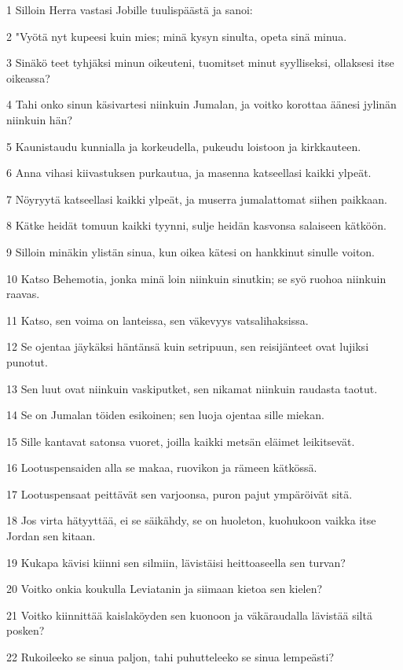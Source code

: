 \par 1 Silloin Herra vastasi Jobille tuulispäästä ja sanoi:
\par 2 "Vyötä nyt kupeesi kuin mies; minä kysyn sinulta, opeta sinä minua.
\par 3 Sinäkö teet tyhjäksi minun oikeuteni, tuomitset minut syylliseksi, ollaksesi itse oikeassa?
\par 4 Tahi onko sinun käsivartesi niinkuin Jumalan, ja voitko korottaa äänesi jylinän niinkuin hän?
\par 5 Kaunistaudu kunnialla ja korkeudella, pukeudu loistoon ja kirkkauteen.
\par 6 Anna vihasi kiivastuksen purkautua, ja masenna katseellasi kaikki ylpeät.
\par 7 Nöyryytä katseellasi kaikki ylpeät, ja muserra jumalattomat siihen paikkaan.
\par 8 Kätke heidät tomuun kaikki tyynni, sulje heidän kasvonsa salaiseen kätköön.
\par 9 Silloin minäkin ylistän sinua, kun oikea kätesi on hankkinut sinulle voiton.
\par 10 Katso Behemotia, jonka minä loin niinkuin sinutkin; se syö ruohoa niinkuin raavas.
\par 11 Katso, sen voima on lanteissa, sen väkevyys vatsalihaksissa.
\par 12 Se ojentaa jäykäksi häntänsä kuin setripuun, sen reisijänteet ovat lujiksi punotut.
\par 13 Sen luut ovat niinkuin vaskiputket, sen nikamat niinkuin raudasta taotut.
\par 14 Se on Jumalan töiden esikoinen; sen luoja ojentaa sille miekan.
\par 15 Sille kantavat satonsa vuoret, joilla kaikki metsän eläimet leikitsevät.
\par 16 Lootuspensaiden alla se makaa, ruovikon ja rämeen kätkössä.
\par 17 Lootuspensaat peittävät sen varjoonsa, puron pajut ympäröivät sitä.
\par 18 Jos virta hätyyttää, ei se säikähdy, se on huoleton, kuohukoon vaikka itse Jordan sen kitaan.
\par 19 Kukapa kävisi kiinni sen silmiin, lävistäisi heittoaseella sen turvan?
\par 20 Voitko onkia koukulla Leviatanin ja siimaan kietoa sen kielen?
\par 21 Voitko kiinnittää kaislaköyden sen kuonoon ja väkäraudalla lävistää siltä posken?
\par 22 Rukoileeko se sinua paljon, tahi puhutteleeko se sinua lempeästi?
